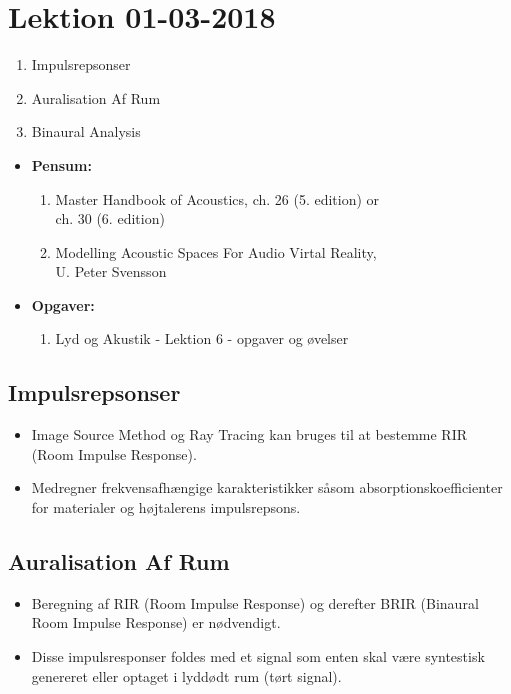 \section{Lektion 01-03-2018}

\begin{enumerate}
	\item Impulsrepsonser
	\item Auralisation Af Rum
	\item Binaural Analysis
\end{enumerate}

\begin{mdframed}[style=exampledefault]
	\begin{itemize}
		\item \textbf{Pensum:} 
		\begin{enumerate}
			\item Master Handbook of Acoustics, ch. 26 (5. edition) or \\ch. 30 (6. edition)
			\item Modelling Acoustic Spaces For Audio Virtal Reality, \\U. Peter Svensson
		\end{enumerate}
		\item \textbf{Opgaver:} 
		\begin{enumerate}
			\item Lyd og Akustik - Lektion 6 - opgaver og øvelser
		\end{enumerate}
	\end{itemize}
\end{mdframed}


\subsection{Impulsrepsonser}
\begin{itemize}
	\item Image Source Method og Ray Tracing kan bruges til at bestemme RIR (Room Impulse Response).
	\item Medregner frekvensafhængige karakteristikker såsom absorptionskoefficienter for materialer og højtalerens impulsrepsons.
\end{itemize}
\newpage

\subsection{Auralisation Af Rum}
\begin{itemize}
	\item Beregning af RIR (Room Impulse Response) og derefter BRIR (Binaural Room Impulse Response) er nødvendigt.
	\item Disse impulsresponser foldes med et signal som enten skal være syntestisk genereret eller optaget i lyddødt rum (tørt signal). 
\end{itemize}

